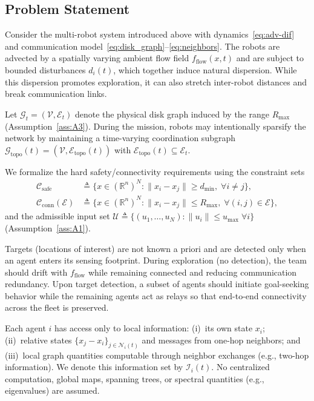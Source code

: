 
\subsection{Problem Statement}
\label{subsec:problem_statement}

Consider the multi-robot system introduced above with dynamics~\eqref{eq:adv-dif} and communication model~\eqref{eq:disk_graph}--\eqref{eq:neighbors}. The robots are advected by a spatially varying ambient flow field $f_{\text{flow}}(x,t)$ and are subject to bounded disturbances $d_i(t)$, which together induce natural dispersion. While this dispersion promotes exploration, it can also stretch inter-robot distances and break communication links.

Let $\mathcal{G}_t=(\mathcal{V},\mathcal{E}_t)$ denote the physical disk graph induced by the range $R_{\max}$ (Assumption~\ref{ass:A3}). During the mission, robots may intentionally sparsify the network by maintaining a time-varying coordination subgraph $\mathcal{G}_{\mathrm{topo}}(t)=(\mathcal{V},\mathcal{E}_{\mathrm{topo}}(t))$ with $\mathcal{E}_{\mathrm{topo}}(t)\subseteq \mathcal{E}_t$.

We formalize the hard safety/connectivity requirements using the constraint sets
\begin{align*}
\mathcal{C}_{\mathrm{safe}} &\triangleq \Big\{x\in(\mathbb{R}^n)^N : \|x_i-x_j\|\ge d_{\min},\;\forall i\neq j\Big\},\\
\mathcal{C}_{\mathrm{conn}}(\mathcal{E}) &\triangleq \Big\{x\in(\mathbb{R}^n)^N : \|x_i-x_j\|\le R_{\max},\;\forall (i,j)\in\mathcal{E}\Big\},
\end{align*}
and the admissible input set $\mathcal{U}\triangleq\{(u_1,\dots,u_N):\|u_i\|\le u_{\max}\;\forall i\}$ (Assumption~\ref{ass:A1}).

Targets (locations of interest) are not known a priori and are detected only when an agent enters its sensing footprint. During exploration (no detection), the team should drift with $f_{\text{flow}}$ while remaining connected and reducing communication redundancy. Upon target detection, a subset of agents should initiate goal-seeking behavior while the remaining agents act as relays so that end-to-end connectivity across the fleet is preserved.

Each agent $i$ has access only to local information: (i)~its own state $x_i$; (ii)~relative states $\{x_j-x_i\}_{j\in\mathcal{N}_i(t)}$ and messages from one-hop neighbors; and (iii)~local graph quantities computable through neighbor exchanges (e.g., two-hop information). We denote this information set by $\mathcal{I}_i(t)$. No centralized computation, global maps, spanning trees, or spectral quantities (e.g., eigenvalues) are assumed.

